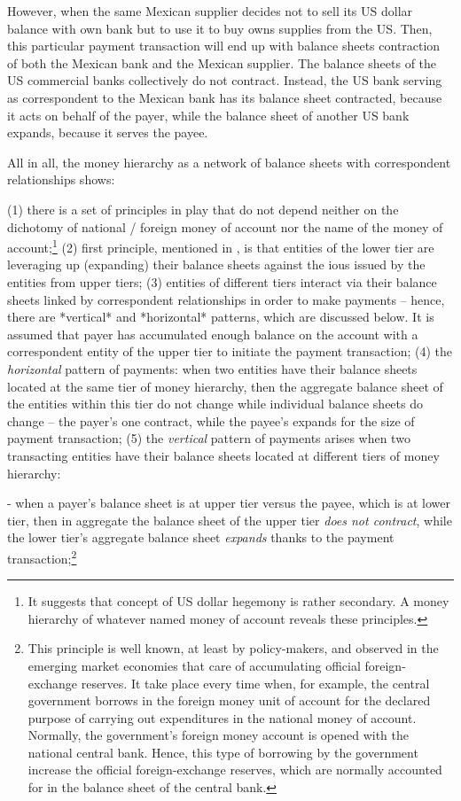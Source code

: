 However, when the same Mexican supplier decides not to sell its US
dollar balance with own bank but to use it to buy owns supplies from the
US. Then, this particular payment transaction will end up with balance
sheets contraction of both the Mexican bank and the Mexican supplier.
The balance sheets of the US commercial banks collectively do not
contract. Instead, the US bank serving as correspondent to the Mexican
bank has its balance sheet contracted, because it acts on behalf of the
payer, while the balance sheet of another US bank expands, because it
serves the payee.

All in all, the money hierarchy as a network of balance sheets with
correspondent relationships shows:

(1) there is a set of principles in play that do not depend neither on
    the dichotomy of national / foreign money of account nor the
    name of the money of account;\footnote{It suggests that concept of US dollar hegemony is rather
    secondary. A money hierarchy of whatever named money of account
    reveals these principles.}
(2) first principle, mentioned in \citep{wray2020}, is that entities of the
    lower tier are leveraging up (expanding) their balance sheets
    against the \acp{iou} issued by the entities from upper tiers;
(3) entities of different tiers interact via their balance sheets linked
    by correspondent relationships in order to make payments -- hence,
    there are *vertical* and *horizontal* patterns, which are discussed
    below. It is assumed that payer has accumulated enough balance on
    the account with a correspondent entity of the upper tier to
    initiate the payment transaction;
(4) the \textit{horizontal} pattern of payments: when two entities have their
    balance sheets located at the same tier of money hierarchy, then the
    aggregate balance sheet of the entities within this tier do not
    change while individual balance sheets do change -- the payer's one
    contract, while the payee's expands for the size of payment
    transaction;
(5) the \textit{vertical} pattern of payments arises when two transacting
    entities have their balance sheets located at different tiers of
    money hierarchy:

-   when a payer's balance sheet is at upper tier versus the payee,
    which is at lower tier, then in aggregate the balance sheet of the
    upper tier \textit{does not contract}, while the lower tier's
    aggregate balance sheet \textit{expands} thanks to the payment
    transaction;\footnote{This principle is well known, at least by policy-makers, and
    observed in the emerging market economies that care of accumulating
    official foreign-exchange reserves. It take place every time when,
    for example, the central government borrows in the foreign money
    unit of account for the declared purpose of carrying out
    expenditures in the national money of account. Normally, the
    government's foreign money account is opened with the national
    central bank. Hence, this type of borrowing by the government
    increase the official foreign-exchange reserves, which are normally
    accounted for in the balance sheet of the central bank.}

